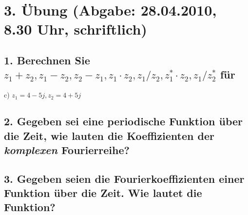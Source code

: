 \section*{3. \"Ubung (Abgabe: 28.04.2010, 8.30 Uhr, schriftlich)}

\subsection*{1. Berechnen Sie $z_{1}+z_{2}, z_{1}-z_{2}, z_{2}-z_{1}, z_{1}\cdot z_{2}, z_{1}/z_{2}, z_{1}^{*}\cdot z_{2}, z_{1}/z_{2}^{*}$ f\"ur}
c) $z_{1}=4-5j, z_{2}=4+5j$

\subsection*{2. Gegeben sei eine periodische Funktion \"uber die Zeit, wie lauten die Koeffizienten der \emph{komplexen} Fourierreihe?}

\subsection*{3. Gegeben seien die Fourierkoeffizienten einer Funktion \"uber die Zeit. Wie lautet die Funktion?}
